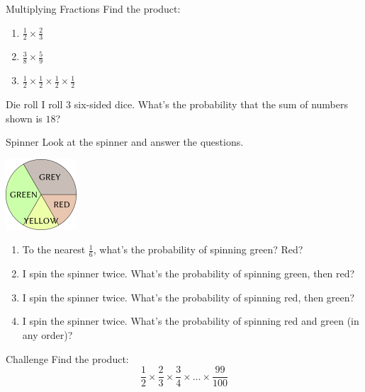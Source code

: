 \documentclass[12pt,letterpaper]{article}
\begin{document}
\begin{problem}{Multiplying Fractions}
Find the product:

\begin{enumerate}[\hspace{.5cm}a.]
\item $\frac{1}{2} \times \frac{2}{3}$
\item $\frac{3}{8} \times \frac{5}{9}$
\item $\frac{1}{2} \times \frac{1}{2} \times \frac{1}{2} \times \frac{1}{2}$
\end{enumerate}
\end{problem}

\begin{problem}{Die roll}
I roll $3$ six-sided dice. What's the probability that the sum of numbers shown
is $18$?
\end{problem}

\begin{problem}{Spinner}
 Look at the spinner and answer the questions.
 \begin{center}
 \includegraphics[width=100px]{./spinner.png}
 \end{center}

 \begin{enumerate}[\hspace{.5cm}a.]
  \item To the nearest $\frac{1}{6}$, what's the probability of spinning green?
  Red?
  \item I spin the spinner twice. What's the probability of spinning green, then
  red?
  \item I spin the spinner twice. What's the probability of spinning red, then
  green?
  \item I spin the spinner twice. What's the probability of spinning red and
  green (in any order)?
 \end{enumerate}
\end{problem}

\begin{problem}{Challenge}
 Find the product:
 \[
  \frac{1}{2} \times \frac{2}{3} \times \frac{3}{4} \times
  \dots \times \frac{99}{100}
 \]
\end{problem}
\end{document}
